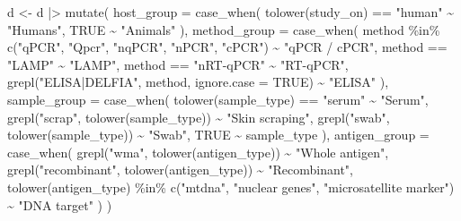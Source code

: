 \documentclass[
  letterpaper,
  DIV=11,
  numbers=noendperiod]{scrartcl}
\newenvironment{Shaded}{\begin{snugshade}}{\end{snugshade}}
\newcommand{\AttributeTok}[1]{\textcolor[rgb]{0.40,0.45,0.13}{#1}}
\newcommand{\ConstantTok}[1]{\textcolor[rgb]{0.56,0.35,0.01}{#1}}
\newcommand{\FunctionTok}[1]{\textcolor[rgb]{0.28,0.35,0.67}{#1}}
\newcommand{\NormalTok}[1]{\textcolor[rgb]{0.00,0.23,0.31}{#1}}
\newcommand{\OtherTok}[1]{\textcolor[rgb]{0.00,0.23,0.31}{#1}}
\newcommand{\SpecialCharTok}[1]{\textcolor[rgb]{0.37,0.37,0.37}{#1}}
\newcommand{\StringTok}[1]{\textcolor[rgb]{0.13,0.47,0.30}{#1}}
\begin{document}
\begin{Shaded}
\begin{Highlighting}[]
\NormalTok{d }\OtherTok{\textless{}{-}}\NormalTok{ d }\SpecialCharTok{|\textgreater{}} \FunctionTok{mutate}\NormalTok{(}
  \AttributeTok{host\_group =} \FunctionTok{case\_when}\NormalTok{(}
    \FunctionTok{tolower}\NormalTok{(study\_on) }\SpecialCharTok{==} \StringTok{"human"} \SpecialCharTok{\textasciitilde{}} \StringTok{"Humans"}\NormalTok{,}
    \ConstantTok{TRUE} \SpecialCharTok{\textasciitilde{}} \StringTok{"Animals"}
\NormalTok{  ),}
  \AttributeTok{method\_group =} \FunctionTok{case\_when}\NormalTok{(}
\NormalTok{    method }\SpecialCharTok{\%in\%} \FunctionTok{c}\NormalTok{(}\StringTok{"qPCR"}\NormalTok{, }\StringTok{"Qpcr"}\NormalTok{, }\StringTok{"nqPCR"}\NormalTok{, }\StringTok{"nPCR"}\NormalTok{, }\StringTok{"cPCR"}\NormalTok{) }\SpecialCharTok{\textasciitilde{}} \StringTok{"qPCR / cPCR"}\NormalTok{,}
\NormalTok{    method }\SpecialCharTok{==} \StringTok{"LAMP"} \SpecialCharTok{\textasciitilde{}} \StringTok{"LAMP"}\NormalTok{,}
\NormalTok{    method }\SpecialCharTok{==} \StringTok{"nRT{-}qPCR"} \SpecialCharTok{\textasciitilde{}} \StringTok{"RT{-}qPCR"}\NormalTok{,}
    \FunctionTok{grepl}\NormalTok{(}\StringTok{"ELISA|DELFIA"}\NormalTok{, method, }\AttributeTok{ignore.case =} \ConstantTok{TRUE}\NormalTok{) }\SpecialCharTok{\textasciitilde{}} \StringTok{"ELISA"}
\NormalTok{  ),}
  \AttributeTok{sample\_group =} \FunctionTok{case\_when}\NormalTok{(}
    \FunctionTok{tolower}\NormalTok{(sample\_type) }\SpecialCharTok{==} \StringTok{"serum"} \SpecialCharTok{\textasciitilde{}} \StringTok{"Serum"}\NormalTok{,}
    \FunctionTok{grepl}\NormalTok{(}\StringTok{"scrap"}\NormalTok{, }\FunctionTok{tolower}\NormalTok{(sample\_type)) }\SpecialCharTok{\textasciitilde{}} \StringTok{"Skin scraping"}\NormalTok{,}
    \FunctionTok{grepl}\NormalTok{(}\StringTok{"swab"}\NormalTok{, }\FunctionTok{tolower}\NormalTok{(sample\_type)) }\SpecialCharTok{\textasciitilde{}} \StringTok{"Swab"}\NormalTok{,}
    \ConstantTok{TRUE} \SpecialCharTok{\textasciitilde{}}\NormalTok{ sample\_type}
\NormalTok{  ),}
  \AttributeTok{antigen\_group =} \FunctionTok{case\_when}\NormalTok{(}
    \FunctionTok{grepl}\NormalTok{(}\StringTok{"wma"}\NormalTok{, }\FunctionTok{tolower}\NormalTok{(antigen\_type)) }\SpecialCharTok{\textasciitilde{}} \StringTok{"Whole antigen"}\NormalTok{,}
    \FunctionTok{grepl}\NormalTok{(}\StringTok{"recombinant"}\NormalTok{, }\FunctionTok{tolower}\NormalTok{(antigen\_type)) }\SpecialCharTok{\textasciitilde{}} \StringTok{"Recombinant"}\NormalTok{,}
    \FunctionTok{tolower}\NormalTok{(antigen\_type) }\SpecialCharTok{\%in\%} \FunctionTok{c}\NormalTok{(}\StringTok{"mtdna"}\NormalTok{, }\StringTok{"nuclear genes"}\NormalTok{, }\StringTok{"microsatellite marker"}\NormalTok{) }\SpecialCharTok{\textasciitilde{}} \StringTok{"DNA target"}
\NormalTok{  )}
\NormalTok{)}


\end{Highlighting}
\end{Shaded}
\end{document}
